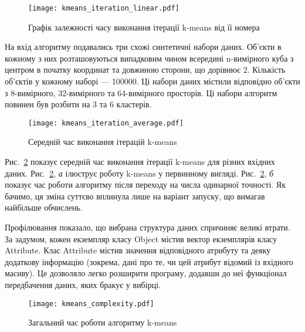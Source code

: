                \begin{figure}
                    \centering
                    \texttt{[image: kmeans\_iteration\_linear.pdf]}
                    \caption{Графік залежності часу виконання ітерації k-means від її номера}\label{fig:kmeans_linear}
                \end{figure}
                
                На вхід алгоритму подавались три схожі синтетичні набори даних. Об’єкти в кожному з них розташовуються випадковим чином всередині n-вимірного куба з центром в початку координат та довжиною сторони, що дорівнює 2. Кількість об’єктів у кожному наборі --- 100000. Ці набори даних містили відповідно об’єкти з 8-вимірного, 32-вимірного та 64-вимірного просторів. Ці набори алгоритм повинен був розбити на 3 та 6 кластерів.
                
                \begin{figure}
                    \centering
                    \texttt{[image: kmeans\_iteration\_average.pdf]}
                    \caption{Середній час виконання ітерацій k-means}\label{fig:kmeans_average}
                \end{figure}
                
                Рис.~\ref{fig:kmeans_average} показує середній час виконання ітерації k-means для різних вхідних даних. Рис.~\ref{fig:kmeans_average}, \emph{а} ілюструє роботу k-means у первинному вигляді. Рис.~\ref{fig:kmeans_average}, \emph{б} показує час роботи алгоритму після переходу на числа одинарної точності. Як бачимо, ця зміна суттєво вплинула лише на варіант запуску, що вимагав найбільше обчислень.
                
                Профілювання показало, що вибрана структура даних спричиняє великі втрати. За задумом, кожен екземпляр класу Object містив вектор екземплярів класу Attribute. Клас Attribute містив значення відповідного атрибуту та деяку додаткову інформацію (зокрема, дані про те, чи цей атрибут відомий із вхідного масиву). Це дозволяло легко розширити програму, додавши до неї функціонал передбачення даних, яких бракує у вибірці.
                
                \begin{figure}
                    \centering
                    \texttt{[image: kmeans\_complexity.pdf]}
                    \caption{Загальний час роботи алгоритму k-means}\label{fig:kmeans_complexity}
                \end{figure}
                
